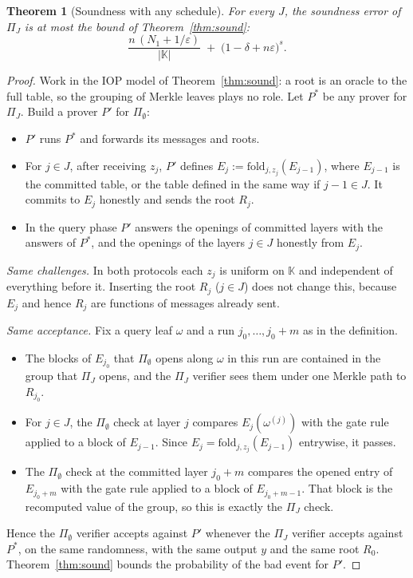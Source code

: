 \documentclass[11pt]{article}
\newtheorem{theorem}{Theorem}[section]
\theoremstyle{definition}
\newcommand{\K}{\mathbb{K}}
\newcommand{\fold}{\mathrm{fold}}
\begin{document}
\begin{theorem}[Soundness with any schedule]\label{thm:schedule}
For every $J$, the soundness error of $\Pi_J$ is at most the bound of Theorem~\ref{thm:sound}:
\[
\frac{n\,(N_1+1/\varepsilon)}{|\K|}\;+\;\bigl(1-\delta+n\varepsilon\bigr)^{s}.
\]
\end{theorem}
\begin{proof}
Work in the IOP model of Theorem~\ref{thm:sound}: a root is an oracle to the full table, so the grouping of Merkle leaves plays no role. Let $P^{*}$ be any prover for $\Pi_J$. Build a prover $P'$ for $\Pi_\emptyset$:
\begin{itemize}[leftmargin=*]
\item $P'$ runs $P^{*}$ and forwards its messages and roots.
\item For $j\in J$, after receiving $z_j$, $P'$ defines $E_j:=\fold_{j,z_j}(E_{j-1})$, where $E_{j-1}$ is
the committed table, or the table defined in the same way if $j-1\in J$. It commits to $E_j$ honestly
and sends the root $R_j$.
\item In the query phase $P'$ answers the openings of committed layers with the answers of $P^{*}$,
and the openings of the layers $j\in J$ honestly from $E_j$.
\end{itemize}
\emph{Same challenges.} In both protocols each $z_j$ is uniform on $\K$ and independent of
everything before it. Inserting the root $R_j$ ($j\in J$) does not change this, because $E_j$ and
hence $R_j$ are functions of messages already sent.

\emph{Same acceptance.} Fix a query leaf $\omega$ and a run $j_0,\dots,j_0+m$ as in the definition.
\begin{itemize}[leftmargin=*]
\item The blocks of $E_{j_0}$ that $\Pi_\emptyset$ opens along $\omega$ in this run are contained in the
group that $\Pi_J$ opens, and the $\Pi_J$ verifier sees them under one Merkle path to $R_{j_0}$.
\item For $j\in J$, the $\Pi_\emptyset$ check at layer $j$ compares $E_j(\omega^{(j)})$ with the gate rule
applied to a block of $E_{j-1}$. Since $E_j=\fold_{j,z_j}(E_{j-1})$ entrywise, it passes.
\item The $\Pi_\emptyset$ check at the committed layer $j_0+m$ compares the opened entry of $E_{j_0+m}$
with the gate rule applied to a block of $E_{j_0+m-1}$. That block is the recomputed value of the
group, so this is exactly the $\Pi_J$ check.
\end{itemize}
Hence the $\Pi_\emptyset$ verifier accepts against $P'$ whenever the $\Pi_J$ verifier accepts against
$P^{*}$, on the same randomness, with the same output $y$ and the same root $R_0$. Theorem~\ref{thm:sound}
bounds the probability of the bad event for $P'$.
\end{proof}
\end{document}
